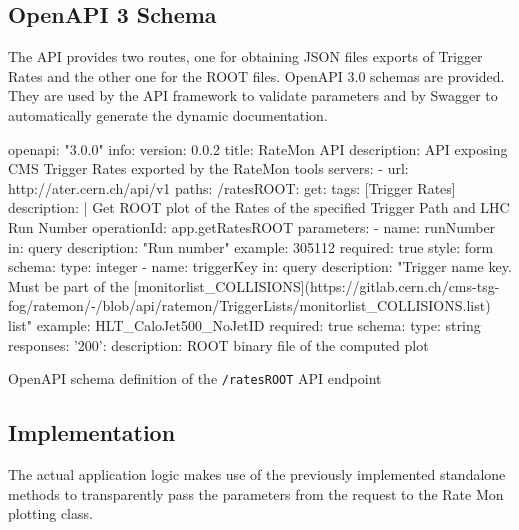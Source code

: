 \subsection{OpenAPI 3 Schema}

The API provides two routes, one for obtaining JSON files exports of Trigger Rates and the other one for the ROOT files. OpenAPI 3.0 schemas are provided. They are used by the API framework to validate parameters and by Swagger to automatically generate the dynamic documentation.

\begin{listing}[ht]
\begin{yamlcode}
openapi: "3.0.0"
info:
  version: 0.0.2
  title: RateMon API
  description: API exposing CMS Trigger Rates exported by the RateMon tools
servers:
  - url: http://ater.cern.ch/api/v1
paths:
  /ratesROOT:
    get:
      tags: [Trigger Rates]
      description: |
        Get ROOT plot of the Rates of the specified Trigger Path and LHC Run Number
      operationId: app.getRatesROOT
      parameters:
        - name: runNumber
          in: query
          description: "Run number"
          example: 305112
          required: true
          style: form
          schema:
            type: integer
        - name: triggerKey
          in: query
          description: "Trigger name key. Must be part of the [monitorlist_COLLISIONS](https://gitlab.cern.ch/cms-tsg-fog/ratemon/-/blob/api/ratemon/TriggerLists/monitorlist_COLLISIONS.list) list"
          example: HLT_CaloJet500_NoJetID
          required: true
          schema:
            type: string
      responses:
        '200':
          description: ROOT binary file of the computed plot
\end{yamlcode}
\caption{OpenAPI schema definition of the \texttt{/ratesROOT} API endpoint}
\end{listing}

\subsection{Implementation}

The actual application logic makes use of the previously implemented standalone methods to transparently pass the parameters from the request to the Rate Mon plotting class.


